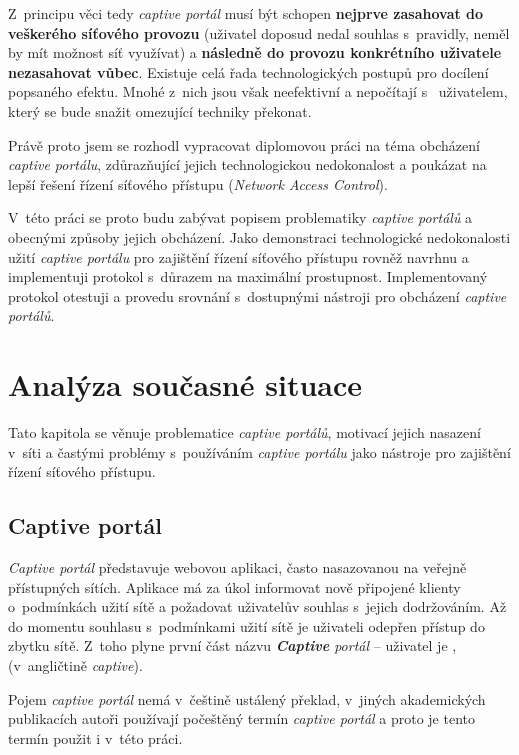 \documentclass[thesis=M,czech]{FITthesis}[2012/10/20]
\begin{document}
\begin{introduction}
Z~principu věci tedy \textit{captive portál} musí být schopen \textbf{nejprve zasahovat do veškerého síťového provozu} (uživatel doposud nedal souhlas s~pravidly, neměl by mít možnost síť využívat) a \textbf{následně do provozu konkrétního uživatele nezasahovat vůbec}. Existuje celá řada technologických postupů pro docílení popsaného efektu. Mnohé z~nich jsou však neefektivní a nepočítají s~ uživatelem, který se bude snažit omezující techniky překonat.

Právě proto jsem se rozhodl vypracovat diplomovou práci na téma obcházení \textit{captive portálu}, zdůrazňující jejich technologickou nedokonalost a poukázat na lepší řešení řízení síťového přístupu (\textit{Network Access Control}).

V~této práci se proto budu zabývat popisem problematiky \textit{captive portálů} a obecnými způsoby jejich obcházení. Jako demonstraci technologické nedokonalosti užití \textit{captive portálu} pro zajištění řízení síťového přístupu rovněž navrhnu a implementuji protokol s~důrazem na maximální prostupnost. Implementovaný protokol otestuji a provedu srovnání s~dostupnými nástroji pro obcházení \textit{captive portálů}.
\end{introduction}

\chapter{Analýza současné situace}

Tato kapitola se věnuje problematice \textit{captive portálů}, motivací jejich nasazení v~síti a častými problémy s~používáním \textit{captive portálu} jako nástroje pro zajištění řízení síťového přístupu.

\section{Captive portál}

\textit{Captive portál}\cite{rfc7710} představuje webovou aplikaci, často nasazovanou na veřejně přístupných sítích. Aplikace má za úkol informovat nově připojené klienty o~podmínkách užití sítě a požadovat uživatelův souhlas s~jejich dodržováním. Až do momentu souhlasu s~podmínkami užití sítě je uživateli odepřen přístup do zbytku sítě. Z~toho plyne první část názvu \textit{\textbf{Captive} portál} -- uživatel je ,  (v~angličtině \textit{captive}).

Pojem \textit{captive portál} nemá v~češtině ustálený překlad, v~jiných akademických publikacích \cite{bakalarka-srovnani-captive-fwall-nac} \cite{bakalarka-plzen-nac-kolejni-sit} autoři používají počeštěný termín \textit{captive portál} a proto je tento termín použit i v~této práci.
\end{document}
